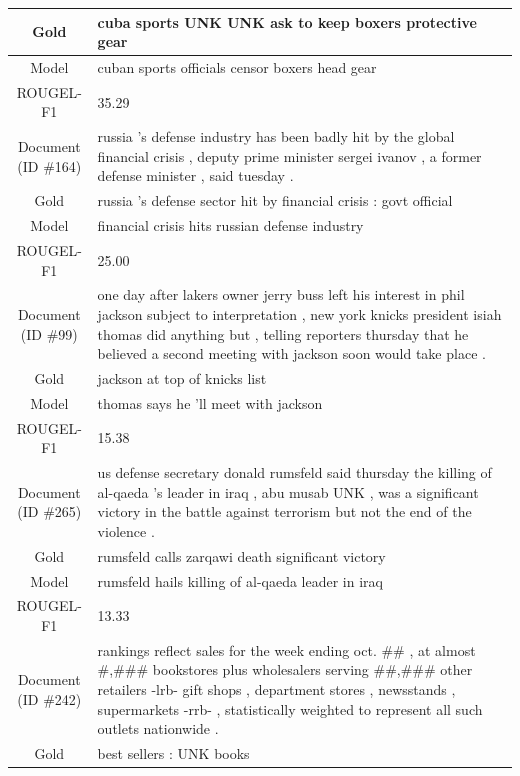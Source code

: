 \begin{table}[bth!]
\begin{tabular}{c|p{}}
\\ \hline
Gold & 
cuba sports UNK UNK ask to keep boxers protective gear
\\ \hline
Model & 
cuban sports officials censor boxers head gear
\\ \hline
ROUGEL-F1 & 
35.29
\\ \hline
\makecell{Document\\(ID \#164)} & 
russia 's defense industry has been badly hit by the global financial crisis , deputy prime minister sergei ivanov , a former defense minister , said tuesday .
\\ \hline
Gold & 
russia 's defense sector hit by financial crisis : govt official
\\ \hline
Model & 
financial crisis hits russian defense industry
\\ \hline
ROUGEL-F1 & 
25.00
\\ \hline
\makecell{Document\\(ID \#99)} & 
one day after lakers owner jerry buss left his interest in phil jackson subject to interpretation , new york knicks president isiah thomas did anything but , telling reporters thursday that he believed a second meeting with jackson soon would take place .
\\ \hline
Gold & 
jackson at top of knicks list
\\ \hline
Model & 
thomas says he 'll meet with jackson
\\ \hline
ROUGEL-F1 & 
15.38
\\ \hline
\makecell{Document\\(ID \#265)} & 
us defense secretary donald rumsfeld said thursday the killing of al-qaeda 's leader in iraq , abu musab UNK , was a significant victory in the battle against terrorism but not the end of the violence .
\\ \hline
Gold & 
rumsfeld calls zarqawi death significant victory
\\ \hline
Model & 
rumsfeld hails killing of al-qaeda leader in iraq
\\ \hline
ROUGEL-F1 & 
13.33
\\ \hline
\makecell{Document\\(ID \#242)} & 
rankings reflect sales for the week ending oct. \#\# , at almost \#,\#\#\# bookstores plus wholesalers serving \#\#,\#\#\# other retailers -lrb- gift shops , department stores , newsstands , supermarkets -rrb- , statistically weighted to represent all such outlets nationwide .
\\ \hline
Gold & 
best sellers : UNK books

\end{tabular}
\end{table}
